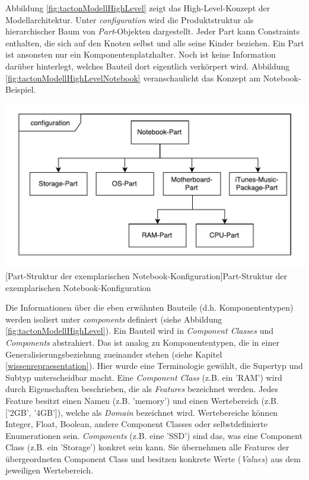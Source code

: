 \documentclass[11pt, a4paper, titlepage, listof=totoc, bibliography=totoc, index=totoc, twoside, openright, headings=normal]{scrreprt}
\begin{document}
Abbildung \ref{fig:tactonModellHighLevel} zeigt das High-Level-Konzept der Modellarchitektur. Unter \emph{configuration} wird die Produktstruktur als hierarchischer Baum von \emph{Part}-Objekten dargestellt. Jeder Part kann Constraints enthalten, die sich auf den Knoten selbst und alle seine Kinder beziehen. Ein Part ist ansonsten nur ein Komponentenplatzhalter. Noch ist keine Information darüber hinterlegt, welches Bauteil dort eigentlich verkörpert wird. Abbildung \ref{fig:tactonModellHighLevelNotebook} veranschaulicht das Konzept am Notebook-Beispiel.

\vspace{1em}
\begin{minipage}{\linewidth}
	\centering
	\includegraphics[width=0.6\linewidth]{Abbildungen/tactonModellHighLevelNotebook.pdf}
	[Part-Struktur der exemplarischen Notebook-Konfiguration]{Part-Struktur der exemplarischen Notebook-Konfiguration}
	\label{fig:tactonModellHighLevelNotebook}
\end{minipage}
\vspace{0.3em}

Die Informationen über die eben erwähnten Bauteile (d.h. Komponententypen) werden isoliert unter \emph{components} definiert (siehe Abbildung \ref{fig:tactonModellHighLevel}). Ein Bauteil wird in \emph{Component Classes} und \emph{Components} abstrahiert. Das ist analog zu Komponententypen, die in einer Generalisierungsbeziehung zueinander stehen (siehe Kapitel \ref{wissenrepraesentation}). Hier wurde eine Terminologie gewählt, die Supertyp und Subtyp unterscheidbar macht. Eine \emph{Component Class} (z.B. ein 'RAM') wird durch Eigenschaften beschrieben, die als \emph{Features} bezeichnet werden. Jedes Feature besitzt einen Namen (z.B. 'memory') und einen Wertebereich (z.B. ['2GB', '4GB']), welche als \emph{Domain} bezeichnet wird. Wertebereiche können Integer, Float, Boolean, andere Component Classes oder selbstdefinierte Enumerationen sein. \emph{Components} (z.B. eine 'SSD') sind das, was eine Component Class (z.B. ein 'Storage') konkret sein kann. Sie übernehmen alle Features der übergeordneten Component Class und besitzen konkrete Werte (\emph{Values}) aus dem jeweiligen Wertebereich.
\end{document}
